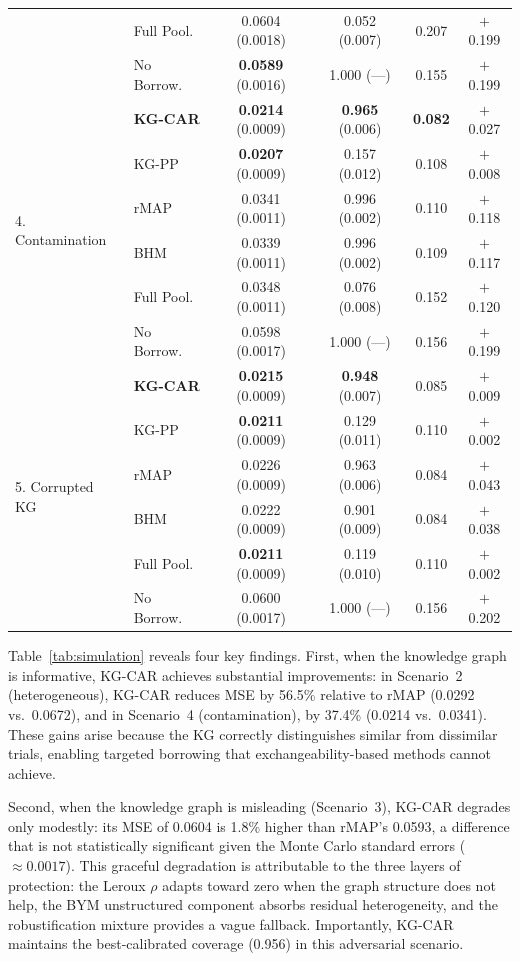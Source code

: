 \documentclass[12pt]{article}
\begin{document}
\begin{table}[ht]
\begin{tabular}{llcccc}
& Full Pool. & 0.0604 (0.0018) & 0.052 (0.007) & 0.207 & $+$0.199 \\
& No Borrow. & \textbf{0.0589} (0.0016) & 1.000 (---) & 0.155 & $+$0.199 \\
\midrule
\multirow{6}{*}{4. Contamination}
& \textbf{KG-CAR} & \textbf{0.0214} (0.0009) & \textbf{0.965} (0.006) & \textbf{0.082} & $+$0.027 \\
& KG-PP & \textbf{0.0207} (0.0009) & 0.157 (0.012) & 0.108 & $+$0.008 \\
& rMAP & 0.0341 (0.0011) & 0.996 (0.002) & 0.110 & $+$0.118 \\
& BHM & 0.0339 (0.0011) & 0.996 (0.002) & 0.109 & $+$0.117 \\
& Full Pool. & 0.0348 (0.0011) & 0.076 (0.008) & 0.152 & $+$0.120 \\
& No Borrow. & 0.0598 (0.0017) & 1.000 (---) & 0.156 & $+$0.199 \\
\midrule
\multirow{6}{*}{5. Corrupted KG}
& \textbf{KG-CAR} & \textbf{0.0215} (0.0009) & \textbf{0.948} (0.007) & 0.085 & $+$0.009 \\
& KG-PP & \textbf{0.0211} (0.0009) & 0.129 (0.011) & 0.110 & $+$0.002 \\
& rMAP & 0.0226 (0.0009) & 0.963 (0.006) & 0.084 & $+$0.043 \\
& BHM & 0.0222 (0.0009) & 0.901 (0.009) & 0.084 & $+$0.038 \\
& Full Pool. & \textbf{0.0211} (0.0009) & 0.119 (0.010) & 0.110 & $+$0.002 \\
& No Borrow. & 0.0600 (0.0017) & 1.000 (---) & 0.156 & $+$0.202 \\
\bottomrule
\end{tabular}
\end{table}

Table~\ref{tab:simulation} reveals four key findings. First, when the knowledge graph is informative, KG-CAR achieves substantial improvements: in Scenario~2 (heterogeneous), KG-CAR reduces MSE by 56.5\% relative to rMAP (0.0292 vs.\ 0.0672), and in Scenario~4 (contamination), by 37.4\% (0.0214 vs.\ 0.0341). These gains arise because the KG correctly distinguishes similar from dissimilar trials, enabling targeted borrowing that exchangeability-based methods cannot achieve.

Second, when the knowledge graph is misleading (Scenario~3), KG-CAR degrades only modestly: its MSE of 0.0604 is 1.8\% higher than rMAP's 0.0593, a difference that is not statistically significant given the Monte Carlo standard errors ($\approx 0.0017$). This graceful degradation is attributable to the three layers of protection: the Leroux $\rho$ adapts toward zero when the graph structure does not help, the BYM unstructured component absorbs residual heterogeneity, and the robustification mixture provides a vague fallback. Importantly, KG-CAR maintains the best-calibrated coverage (0.956) in this adversarial scenario.
\end{document}
